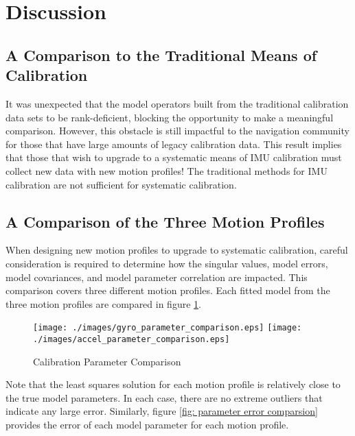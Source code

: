 
\begingroup
\allowdisplaybreaks

\section{Discussion} \label{sec: Discussion}

\subsection{A Comparison to the Traditional Means of Calibration}

It was unexpected that the model operators built from the traditional calibration data sets to be rank-deficient, blocking the opportunity to make a meaningful comparison. However, this obstacle is still impactful to the navigation community for those that have large amounts of legacy calibration data. This result implies that those that wish to upgrade to a systematic means of IMU calibration must collect new data with new motion profiles! The traditional methods for IMU calibration are not sufficient for systematic calibration.


\subsection{A Comparison of the Three Motion Profiles}

When designing new motion profiles to upgrade to systematic calibration, careful consideration is required to determine how the singular values, model errors, model covariances, and model parameter correlation are impacted. This comparison covers three different motion profiles. Each fitted model from the three motion profiles are compared in figure \ref{fig: parameter comparsion}.

\begin{figure}[!h] 
	\centering
	\texttt{[image: ./images/gyro\_parameter\_comparison.eps]} \hfill
	\texttt{[image: ./images/accel\_parameter\_comparison.eps]}
	\caption{Calibration Parameter Comparison}
	\label{fig: parameter comparsion}
\end{figure}
\FloatBarrier

Note that the least squares solution for each motion profile is relatively close to the true model parameters. In each case, there are no extreme outliers that indicate any large error. Similarly, figure \ref{fig: parameter error comparsion} provides the error of each model parameter for each motion profile. 

